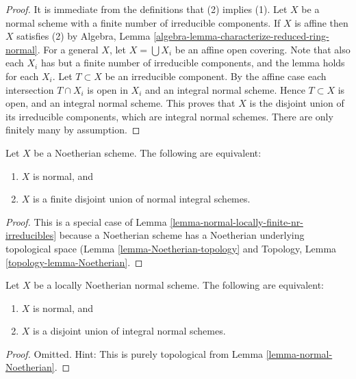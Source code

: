 \begin{proof}
It is immediate from the definitions that (2) implies (1).
Let $X$ be a normal scheme with a finite number of irreducible components.
If $X$ is affine then $X$ satisfies (2) by
Algebra, Lemma \ref{algebra-lemma-characterize-reduced-ring-normal}.
For a general $X$, let $X = \bigcup X_i$ be
an affine open covering. Note that also each $X_i$ has
but a finite number of irreducible components, and the lemma holds
for each $X_i$. Let $T \subset X$ be an irreducible component.
By the affine case each intersection $T \cap X_i$ is open in $X_i$
and an integral normal scheme.
Hence $T \subset X$ is open, and an integral normal scheme.
This proves that $X$ is the disjoint union of its irreducible components,
which are integral normal schemes. There are only finitely many
by assumption.
\end{proof}

\begin{lemma}
\label{lemma-normal-Noetherian}
Let $X$ be a Noetherian scheme.
The following are equivalent:
\begin{enumerate}
\item $X$ is normal, and
\item $X$ is a finite disjoint union of normal integral schemes.
\end{enumerate}
\end{lemma}

\begin{proof}
This is a special case of
Lemma \ref{lemma-normal-locally-finite-nr-irreducibles} because a Noetherian
scheme has a Noetherian underlying topological space
(Lemma \ref{lemma-Noetherian-topology}
and
Topology, Lemma \ref{topology-lemma-Noetherian}.
\end{proof}

\begin{lemma}
\label{lemma-normal-locally-Noetherian}
Let $X$ be a locally Noetherian normal scheme.
The following are equivalent:
\begin{enumerate}
\item $X$ is normal, and
\item $X$ is a disjoint union of integral normal schemes.
\end{enumerate}
\end{lemma}

\begin{proof}
Omitted. Hint: This is purely topological from
Lemma \ref{lemma-normal-Noetherian}.
\end{proof}

